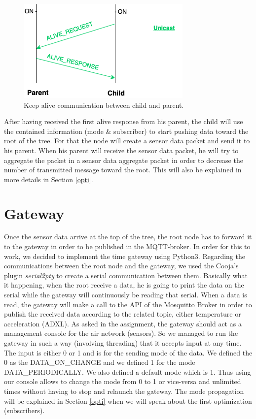 \documentclass[a4paper,10pt]{article}
\begin{document}
\begin{figure}
\centering
\includegraphics[scale=0.6]{./img/alive.png}
\caption{Keep alive communication between child and parent.}
\label{fig:alive}
\end{figure}

After having received the first alive response from his parent, the child will use the contained information (mode \& subscriber) to start pushing data toward the root of the tree. For that the node will create a sensor data packet and send it to his parent. When his parent will receive the sensor data packet, he will try to aggregate the packet in a sensor data aggregate packet in order to decrease the number of transmitted message toward the root. This will also be explained in more details in Section \ref{opti}.

\section{Gateway}
\label{gateway}

Once the sensor data arrive at the top of the tree, the root node has to forward it to the gateway in order to be published in the MQTT-broker. In order for this to work, we decided to implement the time gateway using Python3. Regarding the communications between the root node and the gateway, we used the Cooja's plugin \emph{serial2pty} to create a serial communication between them. Basically what it happening, when the root receive a data, he is going to print the data on the serial while the gateway will continuously be reading that serial. When a data is read, the gateway will make a call to the API of the Mosquitto Broker in order to publish the received data according to the related topic, either temperature or acceleration (ADXL). As asked in the assignment, the gateway should act as a management console for the air network (sensors). So we managed to run the gateway in such a way (involving threading) that it accepts input at any time. The input is either 0 or 1 and is for the sending mode of the data. We defined the 0 as the DATA\_ON\_CHANGE and we defined 1 for the mode DATA\_PERIODICALLY. We also defined a default mode which is 1. Thus using our console allows to change the mode from 0 to 1 or vice-versa and unlimited times without having to stop and relaunch the gateway. The mode propagation will be explained in Section \ref{opti} when we will speak about the first optimization (subscribers).
\end{document}
